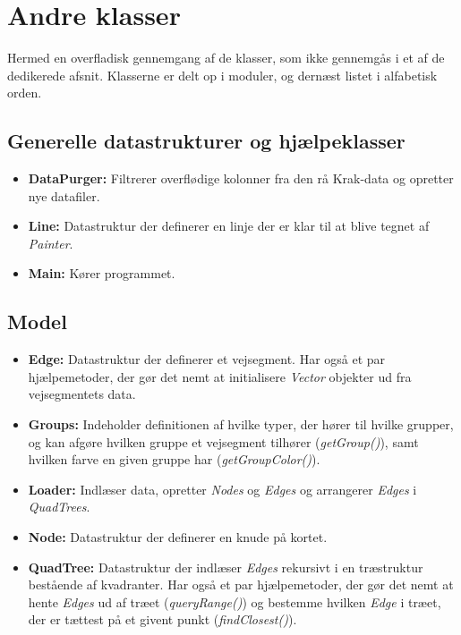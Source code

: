 \section{Andre klasser}

Hermed en overfladisk gennemgang af de klasser, som ikke gennemgås i et af de dedikerede afsnit. Klasserne er delt op i moduler, og dernæst listet i alfabetisk orden.

\subsection{Generelle datastrukturer og hjælpeklasser}

\begin{itemize}
	\item \textbf{DataPurger:} Filtrerer overflødige kolonner fra den rå Krak-data og opretter nye datafiler.
	\item \textbf{Line:} Datastruktur der definerer en linje der er klar til at blive tegnet af \emph{Painter}.
	\item \textbf{Main:} Kører programmet.
\end{itemize}

\subsection{Model}

\begin{itemize}
	\item \textbf{Edge:} Datastruktur der definerer et vejsegment. Har også et par hjælpemetoder, der gør det nemt at initialisere \emph{Vector} objekter ud fra vejsegmentets data.
	\item \textbf{Groups:} Indeholder definitionen af hvilke typer, der hører til hvilke grupper, og kan afgøre hvilken gruppe et vejsegment tilhører (\emph{getGroup()}), samt hvilken farve en given gruppe har (\emph{getGroupColor()}).
	\item \textbf{Loader:} Indlæser data, opretter \emph{Nodes} og \emph{Edges} og arrangerer \emph{Edges} i \emph{QuadTrees}.
	\item \textbf{Node:} Datastruktur der definerer en knude på kortet.
	\item \textbf{QuadTree:} Datastruktur der indlæser \emph{Edges} rekursivt i en træstruktur bestående af kvadranter. Har også et par hjælpemetoder, der gør det nemt at hente \emph{Edges} ud af træet (\emph{queryRange()}) og bestemme hvilken \emph{Edge} i træet, der er tættest på et givent punkt (\emph{findClosest()}).
\end{itemize}

